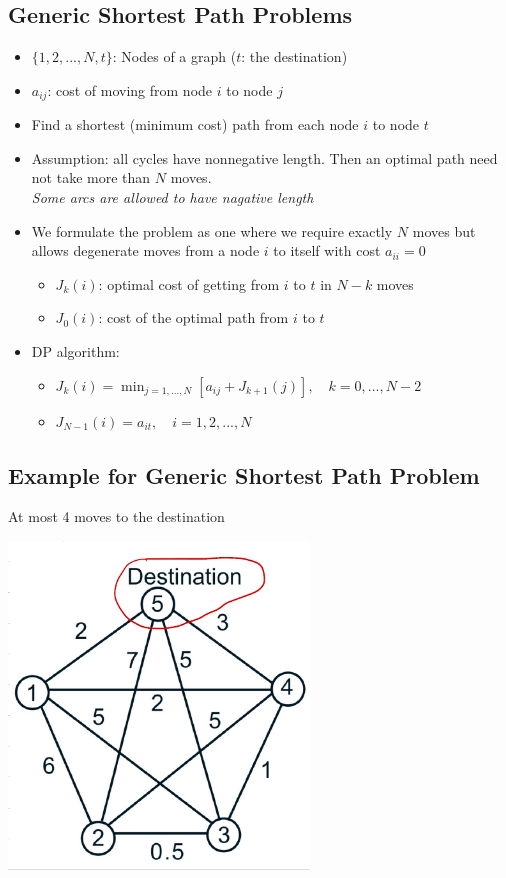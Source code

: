\subsection{Generic Shortest Path Problems}
\begin{itemize}
    \item $\{1,2,...,N,t\}$: Nodes of a graph ($t$: the destination)
    \item $a_{ij}$: cost of moving from node $i$ to node $j$
    \item Find a shortest (minimum cost) path from each node $i$ to node $t$
    \item Assumption: all cycles have nonnegative length. Then an optimal path need not take more than $N$ moves.\\
    \emph{Some arcs are allowed to have nagative length}
    \item We formulate the problem as one where we require exactly $N$ moves but allows degenerate moves from a node $i$ to itself with cost $a_{ii}=0$
    \begin{itemize}
        \item $J_k(i)$: optimal cost of getting from $i$ to $t$ in $N-k$ moves
        \item $J_0(i)$: cost of the optimal path from $i$ to $t$
    \end{itemize}
    \item DP algorithm:
    \begin{itemize}
        \item $J_k(i) = \min_{j=1,...,N}[a_{ij}+J_{k+1}(j)],\quad k = 0,...,N-2$
        \item $J_{N-1}(i) = a_{it},\quad i=1,2,...,N$
    \end{itemize}
\end{itemize}

\subsection{Example for Generic Shortest Path Problem}
At most 4 moves to the destination \\
\centerline{\includegraphics[width=8cm]{Lecture2/Fig2.png}}

